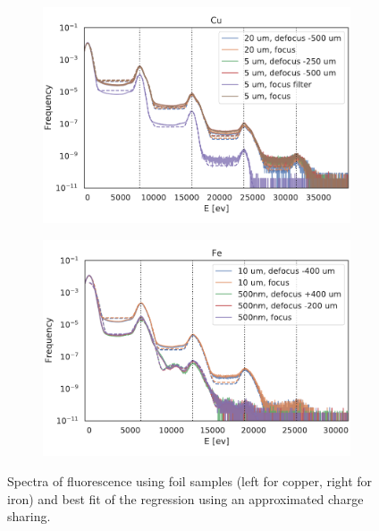 \begin{figure}
	\centering
	\begin{subfigure}[b]{0.49\textwidth}
		\includegraphics[width=\linewidth]{images/spectrum_foil_cu.pdf}
	\end{subfigure}
	\begin{subfigure}[b]{0.49\textwidth}
		\includegraphics[width=\linewidth]{images/spectrum_foil_fe.pdf}
	\end{subfigure}
	\caption[Spectra of fluorescence using foil samples ]{Spectra of fluorescence using foil samples (left for copper, right for iron) and best fit of the regression using an approximated charge sharing.}
	\label{fig:spectrafoil}
\end{figure}



